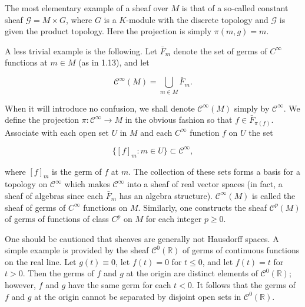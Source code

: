 \begin{examples}\label{thm:5.2}
The most elementary example of a sheaf over $M$ is that of a so-called constant sheaf $\mathcal{G} = M \times G$, where $G$ is a $K$-module with the discrete topology and $\mathcal{G}$ is given the product topology. Here the projection is simply $\pi(m,g) = m$. 

A less trivial example is the following. Let $\bar{F}_{m}$ denote the set of germs of $C^{\infty}$ functions at $m\in M$ (as in 1.13), and let

\begin{equation}
\tag{1}\label{eq:5.2:1}
\mathcal{C}^{\infty}(M)=\bigcup_{m\in M}\bar{F}_{m}.
\end{equation}

When it will introduce no confusion, we shall denote $\mathcal{C}^{\infty}(M)$ simply by $\mathcal{C}^{\infty}$. We define the projection $\pi\colon \mathcal{C}^{\infty} \to M$ in the obvious fashion so that $f \in \bar{F}_{\pi(f)}$. Associate with each open set $U$ in $M$ and each $C^{\infty}$ function $f$ on $U$ the set

\[
\{[f]_m:m\in U\}\subset\mathcal{C}^{\infty},
\]

where  $ [f]_m $ is the germ of  $ f $ at  $ m $. The collection of these sets forms a basis for a topology on  $ \mathcal{C}^\infty $ which makes  $ \mathcal{C}^\infty $ into a sheaf of real vector spaces (in fact, a sheaf of algebras since each  $ \bar{F}_m $ has an algebra structure).  $ \mathcal{C}^\infty(M) $ is called the sheaf of germs of  $ C^\infty $ functions on  $ M $. Similarly, one constructs the sheaf  $ \mathcal{C}^p(M) $ of germs of functions of class  $ C^p $ on  $ M $ for each integer  $ p \geq 0 $. 

\end{examples}

\begin{remarks}\label{thm:5.3}
One should be cautioned that sheaves are generally not Hausdorff spaces. A simple example is provided by the sheaf  $ \mathcal{C}^0(\mathbb{R}) $ of germs of continuous functions on the real line. Let  $ g(t) \equiv 0 $, let  $ f(t) = 0 $ for  $ t \leq 0 $, and let  $ f(t) = t $ for  $ t > 0 $. Then the germs of  $ f $ and  $ g $ at the origin are distinct elements of  $ \mathcal{C}^0(\mathbb{R}) $; however,  $ f $ and  $ g $ have the same germ for each  $ t < 0 $. It follows that the germs of  $ f $ and  $ g $ at the origin cannot be separated by disjoint open sets in  $ \mathcal{C}^0(\mathbb{R}) $.

\end{remarks}

